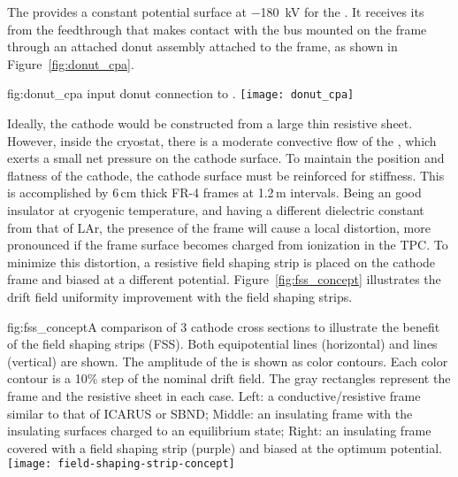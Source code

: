 The  provides a constant potential surface at \SI{-180}{\kV} for the .  It receives its  from the feedthrough that makes contact with the  bus mounted on the  frame through an attached donut assembly attached to the frame, as shown in Figure~\ref{fig:donut_cpa}. %

\begin{dunefigure}{fig:donut_cpa}{ input donut connection to .}
\texttt{[image: donut\_cpa]} %
\end{dunefigure}

Ideally, the cathode would be constructed from a large thin resistive sheet.  However, inside the cryostat, there is a moderate convective flow of the \lar, which exerts a small net pressure on the cathode surface.  To maintain the position and flatness of the cathode, the cathode surface must be reinforced for stiffness.  This is accomplished by 6\,cm thick FR-4 frames at 1.2\,m intervals. Being an good insulator at cryogenic temperature, and having a different dielectric constant from that of LAr, the presence of the frame will cause a local \efield{} distortion, more pronounced if the frame surface becomes charged from ionization in the TPC.  To minimize this distortion, a resistive field shaping strip is placed on the cathode frame and biased at a different potential.  Figure~\ref{fig:fss_concept} illustrates the drift field uniformity improvement with the field shaping strips.

\begin{dunefigure}{fig:fss_concept}{A comparison of 3 cathode cross sections to illustrate the benefit of the field shaping strips (FSS). Both equipotential lines (horizontal) and \efield{} lines (vertical) are shown.  The amplitude of the \efield{} is shown as color contours. Each color contour is a 10\% step of the nominal drift field.  The gray rectangles represent the frame and the resistive sheet in each case. Left: a conductive/resistive frame similar to that of ICARUS or SBND; Middle: an insulating frame with the insulating surfaces charged to an equilibrium state; Right: an insulating frame covered with a field shaping strip (purple) and biased at the optimum potential. }
\texttt{[image: field-shaping-strip-concept]} %
\end{dunefigure}

